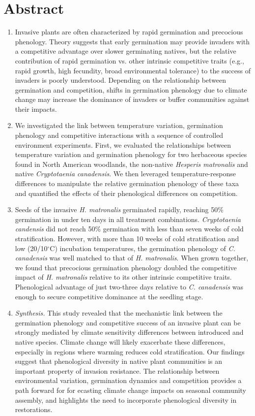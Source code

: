 \documentclass{article}[11pt]
\begin{document}
\section*{Abstract}
\begin{enumerate}
\item Invasive plants are often characterized by rapid germination and precocious phenology. Theory suggests that early germination may provide invaders with a competitive advantage over slower germinating natives, but the relative contribution of rapid germination vs. other intrinsic competitive traits (e.g., rapid growth, high fecundity, broad environmental tolerance) to the success of invaders is poorly understood. Depending on the relationship between germination and competition, shifts in germination phenology due to climate change may increase the dominance of invaders or buffer communities against their impacts.

\item We investigated the link between temperature variation, germination phenology and competitive interactions with a sequence of controlled environment experiments. First, we evaluated the relationships between temperature variation and germination phenology for two herbaceous species found in North American woodlands, the non-native \textit{Hesperis matronalis} and native \textit{Cryptotaenia canadensis}. We then leveraged temperature-response differences to manipulate the relative germination phenology of these taxa and quantified the effects of their phenological differences on competition.

\item Seeds of the invasive \textit{H. matronalis} germinated rapidly, reaching 50\% germination in under ten days in all treatment combinations. \textit{Cryptotaenia candensis} did not reach 50\% germination with less than seven weeks of cold stratification. However, with more than 10 weeks of cold stratification and low (20/10$^{\circ}$C) incubation temperatures, the germination phenology of \textit{C. canadensis} was well matched to that of \textit{H. matronalis}. When grown together, we found that precocious germination phenology doubled the competitive impact of \textit{H. matronalis} relative to its other intrinsic competitive traits. Phenological advantage of just two-three days relative to \textit{C. canadensis} was enough to secure competitive dominance at the seedling stage.

\item \textit{Synthesis.} This study revealed that the mechanistic link between the germination phenology and competitive success of an invasive plant can be strongly mediated by climate sensitivity differences between introduced and native species. Climate change will likely exacerbate these differences, especially in regions where warming reduces cold stratification. Our findings suggest that phenological diversity in native plant communities is an important property of invasion resistance. The relationship between environmental variation, germination dynamics and competition provides a path forward for for ecasting climate change impacts on seasonal community assembly, and highlights the need to incorporate phenological diversity in restorations.


\end{enumerate}
\end{document}
